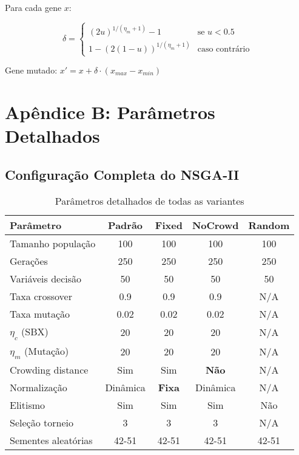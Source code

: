 Para cada gene $x$:

\begin{equation}
\delta = 
\begin{cases}
(2u)^{1/(\eta_m + 1)} - 1 & \text{se } u < 0.5 \\
1 - (2(1-u))^{1/(\eta_m + 1)} & \text{caso contrário}
\end{cases}
\end{equation}

Gene mutado: $x' = x + \delta \cdot (x_{max} - x_{min})$

\section{Apêndice B: Parâmetros Detalhados}

\subsection{Configuração Completa do NSGA-II}

\begin{table}[H]
\centering
\caption{Parâmetros detalhados de todas as variantes}
\begin{tabular}{@{}lcccc@{}}
\toprule
\textbf{Parâmetro} & \textbf{Padrão} & \textbf{Fixed} & \textbf{NoCrowd} & \textbf{Random} \\
\midrule
Tamanho população & 100 & 100 & 100 & 100 \\
Gerações & 250 & 250 & 250 & 250 \\
Variáveis decisão & 50 & 50 & 50 & 50 \\
\midrule
Taxa crossover & 0.9 & 0.9 & 0.9 & N/A \\
Taxa mutação & 0.02 & 0.02 & 0.02 & N/A \\
$\eta_c$ (SBX) & 20 & 20 & 20 & N/A \\
$\eta_m$ (Mutação) & 20 & 20 & 20 & N/A \\
\midrule
Crowding distance & Sim & Sim & \textbf{Não} & N/A \\
Normalização & Dinâmica & \textbf{Fixa} & Dinâmica & N/A \\
Elitismo & Sim & Sim & Sim & Não \\
\midrule
Seleção torneio & 3 & 3 & 3 & N/A \\
Sementes aleatórias & 42-51 & 42-51 & 42-51 & 42-51 \\
\bottomrule
\end{tabular}
\end{table}

